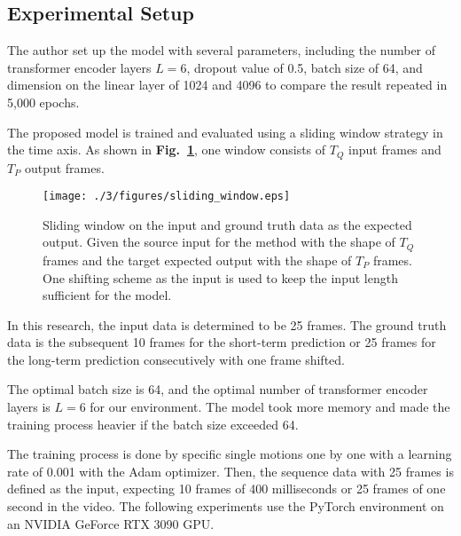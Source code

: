 \subsection{Experimental Setup}
The author set up the model with several parameters, including the number of transformer encoder layers $L=6$, dropout value of 0.5, batch size of 64, and dimension on the linear layer of 1024 and 4096 to compare the result repeated in 5,000 epochs. 


The proposed model is trained and evaluated using a sliding window strategy in the time axis.
As shown in \textbf{Fig.~\ref{fig:sliding_window}}, one window consists of $T_Q$ input frames and $T_P$ output frames.

\begin{figure}
    \centering
    \texttt{[image: ./3/figures/sliding\_window.eps]}
    \caption{
        Sliding window on the input and ground truth data as the expected output.
        Given the source input for the method with the shape of $T_{Q}$ frames and the target expected output with the shape of $T_{P}$ frames.
        One shifting scheme as the input is used to keep the input length sufficient for the model.
    }
    \label{fig:sliding_window}
\end{figure}

In this research, the input data is determined to be 25 frames. The ground truth data is the subsequent 10 frames for the short-term prediction or 25 frames for the long-term prediction consecutively with one frame shifted.

The optimal batch size is 64,
and the optimal number of transformer encoder layers is $L=6$ for our environment.
The model took more memory and made the training process heavier if the batch size exceeded 64. 

The training process is done by specific single motions one by one with a learning rate of 0.001 with the Adam optimizer. Then, the sequence data with 25 frames is defined as the input, expecting 10 frames of 400 milliseconds or 25 frames of one second in the video.
The following experiments use the PyTorch environment on an NVIDIA GeForce RTX 3090 GPU. 

